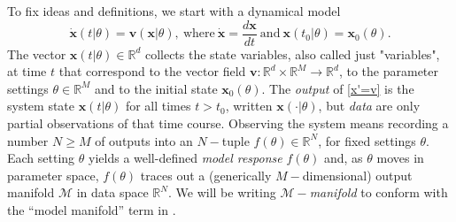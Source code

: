 To fix ideas and definitions, we start with a dynamical model
% 
\begin{equation}
  \dot{\mathbf{x}}(t \vert \theta)
  =
  \mathbf{v}(\mathbf{x} \vert \theta) ,
  \ \mbox{where} \
  \dot{\mathbf{x}}
  =
  \frac{d\mathbf{x}}{dt}
  \ \mbox{and} \
  \mathbf{x}(t_0 \vert \theta) = \mathbf{x}_0(\theta) .
  \label{x'=v}
\end{equation}
% 
The vector $\mathbf{x}(t \vert \theta) \in \mathbb{R}^d$ collects
the state variables, also called just "variables", at time $t$ that
correspond to the vector field
$\mathbf{v} : \mathbb{R}^d \times \mathbb{R}^M \to \mathbb{R}^d$, to
the parameter settings $\theta \in \mathbb{R}^M$ and to the
initial state $\mathbf{x}_0(\theta)$.  The \emph{output} of
\eqref{x'=v} is the system state $\mathbf{x}(t \vert \theta)$ for
all times $t>t_0$, written $\mathbf{x}(\cdot\vert\theta)$, but
\emph{data} are only partial observations of that time course.
Observing the system means recording a number $N \ge M$ of outputs
into an $N-$tuple $f(\theta) \in \mathbb{R}^N$, for fixed
settings $\theta$.  Each setting $\theta$ yields a
well-defined \emph{model response} $f(\theta)$ and, as
$\theta$ moves in parameter space, $f(\theta)$ traces
out a (generically $M-$dimensional) output manifold $\mathcal{M}$ in
data space $\mathbb{R}^N$.  We will be writing
$\mathcal{M}-$\emph{manifold} to conform with the ``model manifold''
term in \cite{TMS}.


